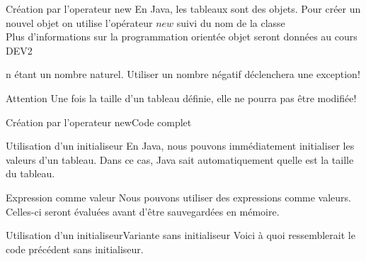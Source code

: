 \begin{frame}{Création par l'operateur new}
    \pause
    En Java, les tableaux sont des objets. Pour créer un nouvel objet on utilise l'opérateur $new$ suivi du nom de la classe\\
    \tiny Plus d'informations sur la programmation orientée objet seront données au cours DEV2 \normalsize

    
    n étant un nombre naturel. Utiliser un nombre négatif déclenchera une exception!

    \pause
    \begin{alertblock}{Attention}
        Une fois la taille d'un tableau d\'efinie, elle ne pourra pas être modifiée!
    \end{alertblock}
\end{frame}

\begin{frame}{Création par l'operateur new}{Code complet}
    
\end{frame}

\begin{frame}{Utilisation d'un initialiseur}
    \pause
    En Java, nous pouvons immédiatement initialiser les valeurs d'un tableau.
    Dans ce cas, Java sait automatiquement quelle est la taille du tableau.
    

    \pause
    \begin{exampleblock}{Expression comme valeur}
        Nous pouvons utiliser des expressions comme valeurs.
        Celles-ci seront évaluées avant d'être sauvegardées en mémoire.
    \end{exampleblock}

\end{frame}

\begin{frame}{Utilisation d'un initialiseur}{Variante sans initialiseur}
    Voici à quoi ressemblerait le code précédent sans initialiseur.
    
\end{frame}